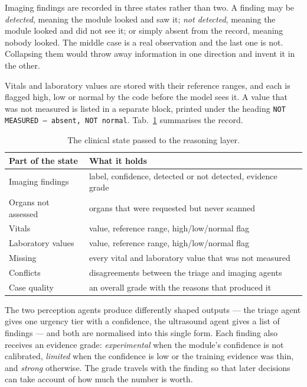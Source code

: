 Imaging findings are recorded in three states rather than two. A finding may be
\emph{detected}, meaning the module looked and saw it; \emph{not detected}, meaning the
module looked and did not see it; or simply absent from the record, meaning nobody looked.
The middle case is a real observation and the last one is not. Collapsing them would throw
away information in one direction and invent it in the other.

Vitals and laboratory values are stored with their reference ranges, and each is flagged
high, low or normal by the code before the model sees it. A value that was not measured is
listed in a separate block, printed under the heading \texttt{NOT MEASURED --- absent, NOT
normal}. Tab.~\ref{tab:statefields} summarises the record.

\begin{table}[H]
  \centering
  \small
  \begin{tabular}{lp{9.2cm}}
    \toprule
    \textbf{Part of the state} & \textbf{What it holds} \\
    \midrule
    Imaging findings   & label, confidence, detected or not detected, evidence grade \\
    Organs not assessed& organs that were requested but never scanned \\
    Vitals             & value, reference range, high/low/normal flag \\
    Laboratory values  & value, reference range, high/low/normal flag \\
    Missing            & every vital and laboratory value that was not measured \\
    Conflicts          & disagreements between the triage and imaging agents \\
    Case quality       & an overall grade with the reasons that produced it \\
    \bottomrule
  \end{tabular}
  \caption{The clinical state passed to the reasoning layer.}
  \label{tab:statefields}
\end{table}

The two perception agents produce differently shaped outputs --- the triage agent gives one
urgency tier with a confidence, the ultrasound agent gives a list of findings --- and both
are normalised into this single form. Each finding also receives an evidence grade:
\emph{experimental} when the module's confidence is not calibrated, \emph{limited} when the
confidence is low or the training evidence was thin, and \emph{strong} otherwise. The grade
travels with the finding so that later decisions can take account of how much the number is
worth.

